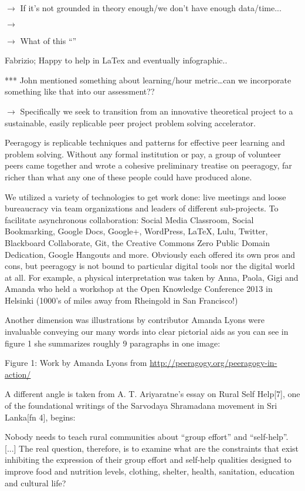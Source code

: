 \documentclass{acm_proc_article-sp}
\begin{document}
$\rightarrow$ If it's not grounded in theory enough/we don't have enough data/time...

$\rightarrow$

$\rightarrow$ What of this ``''


Fabrizio; Happy to help in LaTex and eventually infographic..

*** John mentioned something about learning/hour metric\ldots can we incorporate something like that into our assessment??

$\rightarrow$ Specifically we seek to transition from an innovative theoretical project to a sustainable, easily replicable peer project problem solving accelerator.

Peeragogy is replicable techniques and patterns for effective peer learning and problem solving. Without any formal institution or pay, a group of volunteer peers came together and wrote a cohesive preliminary treatise on peeragogy, far richer than what any one of these people could have produced alone.

We utilized a variety of technologies to get work done: live meetings and loose bureaucracy via team organizations and leaders of different sub-projects. To facilitate asynchronous collaboration: Social Media Classroom, Social Bookmarking, Google Docs, Google+, WordPress, LaTeX, Lulu, Twitter, Blackboard Collaborate, Git, the Creative Commons Zero Public Domain Dedication, Google Hangouts and more. Obviously each offered its own pros and cons, but peeragogy is not bound to particular digital tools nor the digital world at all. For example, a physical interpretation was taken by Anna, Paola, Gigi and Amanda who held a workshop at the Open Knowledge Conference 2013 in Helsinki (1000's of miles away from Rheingold in San Francisco!)

Another dimension was illustrations by contributor Amanda Lyons were invaluable conveying our many words into clear pictorial aids as you can see in figure 1 she summarizes roughly 9 paragraphs in one image:

Figure 1: Work by Amanda Lyons from \url{http://peeragogy.org/peeragogy-in-action/}

A different angle is taken from A. T. Ariyaratne's essay on Rural Self Help[7], one of the foundational writings of the Sarvodaya Shramadana movement in Sri Lanka[fn 4], begins:

Nobody needs to teach rural communities about ``group effort'' and ``self-help''. [...] The real question, therefore, is to examine what are the constraints that exist inhibiting the expression of their group effort and self-help qualities designed to improve food and nutrition levels, clothing, shelter, health, sanitation, education and cultural life?
\end{document}
